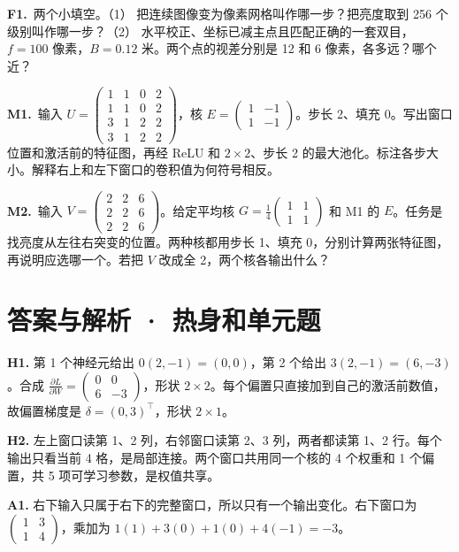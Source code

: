 \documentclass[UTF8,a4paper,11pt]{ctexart}
\newcommand{\PracticeQuestion}[3]{\par\Needspace{4\baselineskip}\noindent\begin{minipage}{\linewidth}\textbf{#1.}\ #2\par\noindent\rule{0pt}{#3mm}\par\end{minipage}\par}
\begin{document}
\PracticeQuestion{F1}{两个小填空。（1） 把连续图像变为像素网格叫作哪一步？把亮度取到 256 个级别叫作哪一步？（2） 水平校正、坐标已减主点且匹配正确的一套双目，$f=100$ 像素，$B=0.12$ 米。两个点的视差分别是 12 和 6 像素，各多远？哪个近？}{35}
\clearpage
\PracticeQuestion{M1}{输入 $U=\begin{pmatrix}1&1&0&2\\1&1&0&2\\3&1&2&2\\3&1&2&2\end{pmatrix}$，核 $E=\begin{pmatrix}1&-1\\1&-1\end{pmatrix}$。步长 2、填充 0。写出窗口位置和激活前的特征图，再经 ReLU 和 $2\times2$、步长 2 的最大池化。标注各步大小。解释右上和左下窗口的卷积值为何符号相反。}{64}
\PracticeQuestion{M2}{输入 $V=\begin{pmatrix}2&2&6\\2&2&6\\2&2&6\end{pmatrix}$。给定平均核 $G=\frac14\begin{pmatrix}1&1\\1&1\end{pmatrix}$ 和 M1 的 $E$。任务是找亮度从左往右突变的位置。两种核都用步长 1、填充 0，分别计算两张特征图，再说明应选哪一个。若把 $V$ 改成全 2，两个核各输出什么？}{64}
\clearpage
\section{答案与解析 · 热身和单元题}
\textbf{H1.} 第 1 个神经元给出 $0(2,-1)=(0,0)$，第 2 个给出 $3(2,-1)=(6,-3)$。合成 $\frac{\partial L}{\partial W}=\begin{pmatrix}0&0\\6&-3\end{pmatrix}$，形状 $2\times2$。每个偏置只直接加到自己的激活前数值，故偏置梯度是 $\delta=(0,3)^\top$，形状 $2\times1$。

\textbf{H2.} 左上窗口读第 1、2 列，右邻窗口读第 2、3 列，两者都读第 1、2 行。每个输出只看当前 4 格，是局部连接。两个窗口共用同一个核的 4 个权重和 1 个偏置，共 5 项可学习参数，是权值共享。

\textbf{A1.} 右下输入只属于右下的完整窗口，所以只有一个输出变化。右下窗口为 $\begin{pmatrix}1&3\\1&4\end{pmatrix}$，乘加为 $1(1)+3(0)+1(0)+4(-1)=-3$。
\end{document}
